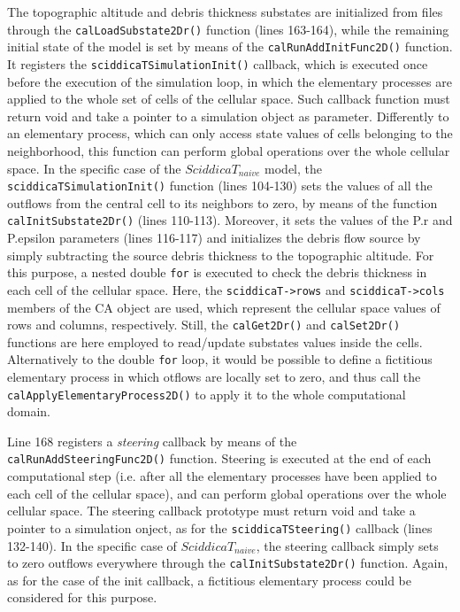 The topographic altitude and debris thickness substates are
initialized from files through the \verb'calLoadSubstate2Dr()'
function (lines 163-164), while the remaining initial state of the
model is set by means of the \verb'calRunAddInitFunc2D()' function. It
registers the \verb'sciddicaTSimulationInit()' callback, which is
executed once before the execution of the simulation loop, in which
the elementary processes are applied to the whole set of cells of the
cellular space. Such callback function must return void and take a
pointer to a simulation object as parameter. Differently to an
elementary process, which can only access state values of cells
belonging to the neighborhood, this function can perform global
operations over the whole cellular space. In the specific case of the
$SciddicaT_{naive}$ model, the \verb'sciddicaTSimulationInit()'
function (lines 104-130) sets the values of all the outflows from the
central cell to its neighbors to zero, by means of the function
\verb'calInitSubstate2Dr()' (lines 110-113). Moreover, it sets the
values of the P.r and P.epsilon parameters (lines 116-117) and
initializes the debris flow source by simply subtracting the source
debris thickness to the topographic altitude. For this purpose, a
nested double \verb'for' is executed to check the debris thickness in
each cell of the cellular space. Here, the \verb'sciddicaT->rows' and
\verb'sciddicaT->cols' members of the CA object are used, which
represent the cellular space values of rows and columns,
respectively. Still, the \verb'calGet2Dr()' and \verb'calSet2Dr()'
functions are here employed to read/update substates values inside the
cells. Alternatively to the double \verb'for' loop, it would be
possible to define a fictitious elementary process in which otflows
are locally set to zero, and thus call the
\verb'calApplyElementaryProcess2D()' to apply it to the whole
computational domain.

Line 168 registers a \emph{steering} callback by means of the
\verb'calRunAddSteeringFunc2D()' function. Steering is executed at the
end of each computational step (i.e. after all the elementary
processes have been applied to each cell of the cellular space), and
can perform global operations over the whole cellular space. The
steering callback prototype must return void and take a pointer to a
simulation onject, as for the \verb'sciddicaTSteering()' callback
(lines 132-140). In the specific case of $SciddicaT_{naive}$, the
steering callback simply sets to zero outflows everywhere through the
\verb'calInitSubstate2Dr()' function. Again, as for the case of the
init callback, a fictitious elementary process could be considered for
this purpose.

